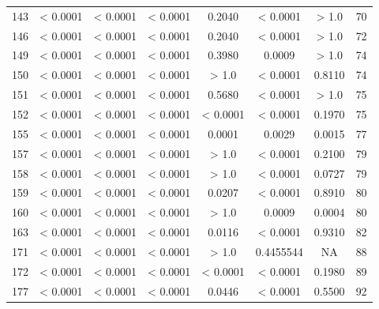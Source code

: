 {\begin{longtable}{cccccccc}
143 & {\color{red} < 0.0001} & {\color{red} < 0.0001} & {\color{red} < 0.0001} & 0.2040 & {\color{red} < 0.0001} & > 1.0 & 70 \\
146 & {\color{red} < 0.0001} & {\color{red} < 0.0001} & {\color{red} < 0.0001} & 0.2040 & {\color{red} < 0.0001} & > 1.0 & 72 \\
149 & {\color{red} < 0.0001} & {\color{red} < 0.0001} & {\color{red} < 0.0001} & 0.3980 & {\color{red}0.0009} & > 1.0 & 74 \\
150 & {\color{red} < 0.0001} & {\color{red} < 0.0001} & {\color{red} < 0.0001} & > 1.0 & {\color{red} < 0.0001} & 0.8110 & 74 \\
151 & {\color{red} < 0.0001} & {\color{red} < 0.0001} & {\color{red} < 0.0001} & 0.5680 & {\color{red} < 0.0001} & > 1.0 & 75 \\
152 & {\color{red} < 0.0001} & {\color{red} < 0.0001} & {\color{red} < 0.0001} & {\color{red} < 0.0001} & {\color{red} < 0.0001} & 0.1970 & 75 \\
155 & {\color{red} < 0.0001} & {\color{red} < 0.0001} & {\color{red} < 0.0001} & {\color{red}0.0001} & {\color{red}0.0029} & {\color{red}0.0015} & 77 \\
157 & {\color{red} < 0.0001} & {\color{red} < 0.0001} & {\color{red} < 0.0001} & > 1.0 & {\color{red} < 0.0001} & 0.2100 & 79 \\
158 & {\color{red} < 0.0001} & {\color{red} < 0.0001} & {\color{red} < 0.0001} & > 1.0 & {\color{red} < 0.0001} & 0.0727 & 79 \\
159 & {\color{red} < 0.0001} & {\color{red} < 0.0001} & {\color{red} < 0.0001} & {\color{red}0.0207} & {\color{red} < 0.0001} & 0.8910 & 80 \\
160 & {\color{red} < 0.0001} & {\color{red} < 0.0001} & {\color{red} < 0.0001} & > 1.0 & {\color{red}0.0009} & {\color{red}0.0004} & 80 \\
163 & {\color{red} < 0.0001} & {\color{red} < 0.0001} & {\color{red} < 0.0001} & {\color{red}0.0116} & {\color{red} < 0.0001} & 0.9310 & 82 \\
171 & {\color{red} < 0.0001} & {\color{red} < 0.0001} & {\color{red} < 0.0001} & > 1.0 & 0.4455544 & NA & 88 \\
172 & {\color{red} < 0.0001} & {\color{red} < 0.0001} & {\color{red} < 0.0001} & {\color{red} < 0.0001} & {\color{red} < 0.0001} & 0.1980 & 89 \\
177 & {\color{red} < 0.0001} & {\color{red} < 0.0001} & {\color{red} < 0.0001} & {\color{red}0.0446} & {\color{red} < 0.0001} & 0.5500 & 92 \\

\end{longtable}}
